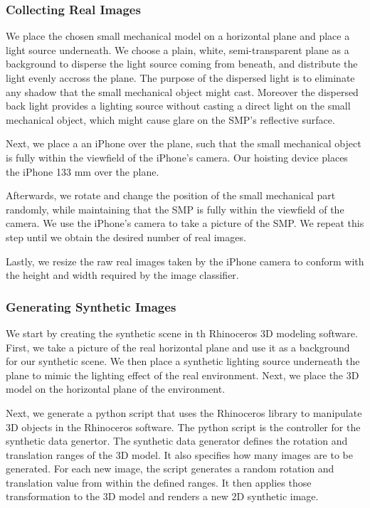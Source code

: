 \subsubsection{Collecting Real Images}
We place the chosen small mechanical model on a horizontal plane and place a light source underneath. We choose a plain, white, semi-transparent plane as a background to disperse the light source coming from beneath, and distribute the light evenly accross the plane. The purpose of the dispersed light is to eliminate any shadow that the small mechanical object might cast. Moreover the dispersed back light provides a lighting source without casting a direct light on the small mechanical object, which might cause glare on the SMP's reflective surface.

Next, we place a an iPhone over the plane, such that the small mechanical object is fully within the viewfield of the iPhone's camera. Our hoisting device places the iPhone 133 mm over the plane.

Afterwards, we rotate and change the position of the small mechanical part randomly, while maintaining that the SMP is fully within the viewfield of the camera. We use the iPhone's camera to take a picture of the SMP. We repeat this step until we obtain the desired number of real images.

Lastly, we resize the raw real images taken by the iPhone camera to conform with the height and width required by the image classifier.

\subsubsection{Generating Synthetic Images}
We start by creating the synthetic scene in th Rhinoceros 3D modeling software. First, we take a picture of the real horizontal plane and use it as a background for our synthetic scene. We then place a synthetic lighting source underneath the plane to mimic the lighting effect of the real environment. Next, we place the 3D model on the horizontal plane of the environment.

Next, we generate a python script that uses the Rhinoceros library to manipulate 3D objects in the Rhinoceros software. The python script is the controller for the synthetic data genertor. The synthetic data generator defines the rotation and translation ranges of the 3D model. It also specifies how many images are to be generated. For each new image, the script generates a random rotation and translation value from within the defined ranges. It then applies those transformation to the 3D model and renders a new 2D synthetic image.

